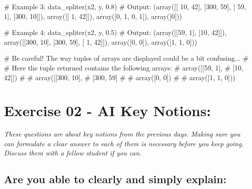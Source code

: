 \documentclass[]{article}
\newenvironment{Shaded}{\begin{snugshade}}{\end{snugshade}}
\newcommand{\CommentTok}[1]{\textcolor[rgb]{0.48,0.49,0.49}{#1}}
\newcommand{\DecValTok}[1]{\textcolor[rgb]{0.96,0.45,0.00}{#1}}
\newcommand{\FloatTok}[1]{\textcolor[rgb]{0.96,0.45,0.00}{#1}}
\newcommand{\NormalTok}[1]{\textcolor[rgb]{0.81,0.81,0.76}{#1}}
\begin{document}
\begin{Shaded}
\begin{Highlighting}[]
\CommentTok{# Example 3:}
\NormalTok{data_spliter(x2, y, }\FloatTok{0.8}\NormalTok{)}
\CommentTok{# Output:}
\NormalTok{(array([[ }\DecValTok{10}\NormalTok{,  }\DecValTok{42}\NormalTok{],}
\NormalTok{        [}\DecValTok{300}\NormalTok{,  }\DecValTok{59}\NormalTok{],}
\NormalTok{        [ }\DecValTok{59}\NormalTok{,   }\DecValTok{1}\NormalTok{],}
\NormalTok{        [}\DecValTok{300}\NormalTok{,  }\DecValTok{10}\NormalTok{]]), array([[ }\DecValTok{1}\NormalTok{, }\DecValTok{42}\NormalTok{]]), array([}\DecValTok{0}\NormalTok{, }\DecValTok{1}\NormalTok{, }\DecValTok{0}\NormalTok{, }\DecValTok{1}\NormalTok{]), array([}\DecValTok{0}\NormalTok{]))}

\CommentTok{# Example 4:}
\NormalTok{data_spliter(x2, y, }\FloatTok{0.5}\NormalTok{)}
\CommentTok{# Output:}
\NormalTok{(array([[}\DecValTok{59}\NormalTok{,  }\DecValTok{1}\NormalTok{],}
\NormalTok{        [}\DecValTok{10}\NormalTok{, }\DecValTok{42}\NormalTok{]]), array([[}\DecValTok{300}\NormalTok{,  }\DecValTok{10}\NormalTok{],}
\NormalTok{        [}\DecValTok{300}\NormalTok{,  }\DecValTok{59}\NormalTok{],}
\NormalTok{        [  }\DecValTok{1}\NormalTok{,  }\DecValTok{42}\NormalTok{]]), array([}\DecValTok{0}\NormalTok{, }\DecValTok{0}\NormalTok{]), array([}\DecValTok{1}\NormalTok{, }\DecValTok{1}\NormalTok{, }\DecValTok{0}\NormalTok{]))}

\CommentTok{# Be careful! The way tuples of arrays are displayed could be a bit confusing... }
\CommentTok{# }
\CommentTok{# Here the tuple returned contains the following arrays: }
\CommentTok{# array([[59,  1],}
\CommentTok{# [10, 42]])}
\CommentTok{#}
\CommentTok{# array([[300,  10],}
\CommentTok{# [300,  59]}
\CommentTok{#}
\CommentTok{# array([0, 0])}
\CommentTok{#}
\CommentTok{# array([1, 1, 0]))}
\end{Highlighting}
\end{Shaded}

\clearpage

\hypertarget{exercise-02---ai-key-notions-1}{%
\section{Exercise 02 - AI Key
Notions:}\label{exercise-02---ai-key-notions-1}}

\emph{These questions are about key notions from the previous days.
Making sure you can formulate a clear answer to each of them is
necessary before you keep going. Discuss them with a fellow student if
you can.}

\hypertarget{are-you-able-to-clearly-and-simply-explain}{%
\subsection{Are you able to clearly and simply
explain:}\label{are-you-able-to-clearly-and-simply-explain}}
\end{document}
